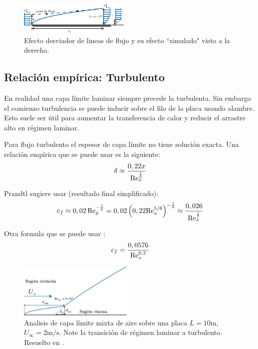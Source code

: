 \begin{figure}[htb!]
    \centering
    \includegraphics[width=0.47\textwidth]{fig/BLdispthick.eps}
    \caption{Efecto desviador de lineas de flujo y su efecto ``simulado"{} visto a la derecha.}
    \label{fig:displthickness}
\end{figure}

\subsection{Relación empírica: Turbulento}
En realidad una capa límite laminar siempre precede la turbulenta. Sin embargo el comienzo turbulencia se puede inducir sobre el filo de la placa usando alambre. Esto suele ser útil para aumentar la transferencia de calor y reducir el arrastre alto en régimen laminar.

Para flujo turbulento el espesor de capa límite no tiene solución exacta. Una relación empírica que se puede usar es la siguiente:
\begin{equation}
    \delta \approx \frac{0,22x}{\textrm{Re}_x^{\frac{1}{6}}}
\end{equation}

Prandtl sugiere usar (resultado final simplificado):
\[
c_f \approx 0,02\, \textrm{Re}_\delta^{-\frac{1}{6}} = 0,02\left(0,22 \textrm{Re}_x^{5/6}\right)^{-\frac{1}{6}}\approx \frac{0,026}{\textrm{Re}_x^{\frac{1}{7}}} 
\]

Otra formula que se puede usar \citep{kreith2011principles}:
\begin{equation}
    c_f=\frac{0,0576}{\textrm{Re}_x^{0,2}}
\end{equation}

\begin{figure}[htb!]
    \centering
    \includegraphics[width=0.48\textwidth]{fig/BLmixed.eps}
    \caption{Analisis de capa límite mixta de aire sobre una placa $L=10\si{\meter}$, $U_\infty=2\si{\meter\per\second}$. Note la transición de régimen laminar a turbulento. Resuelto en \Matlab.}
    \label{fig:BLmixed}
\end{figure}

